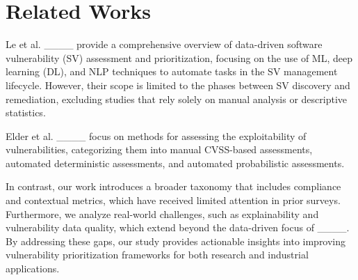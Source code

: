 \section{Related Works}
Le et al. ____ provide a comprehensive overview of data-driven software vulnerability (SV) assessment and prioritization, focusing on the use of ML, deep learning (DL), and NLP techniques to automate tasks in the SV management lifecycle. However, their scope is limited to the phases between SV discovery and remediation, excluding studies that rely solely on manual analysis or descriptive statistics.

Elder et al. ____ focus on methods for assessing the exploitability of vulnerabilities, categorizing them into manual CVSS-based assessments, automated deterministic assessments, and automated probabilistic assessments.

In contrast, our work introduces a broader taxonomy that includes compliance and contextual metrics, which have received limited attention in prior surveys. Furthermore, we analyze real-world challenges, such as explainability and vulnerability data quality, which extend beyond the data-driven focus of ____. By addressing these gaps, our study provides actionable insights into improving vulnerability prioritization frameworks for both research and industrial applications.